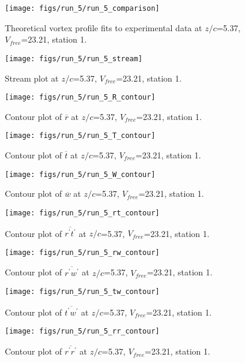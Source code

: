 \begin{figure}[H]
\centering
\texttt{[image: figs/run\_5/run\_5\_comparison]}
\caption{Theoretical vortex profile fits to experimental data at $z/c$=5.37, $V_{free}$=23.21, station 1.}
\end{figure}


\begin{figure}[H]
\centering
\texttt{[image: figs/run\_5/run\_5\_stream]}
\caption{Stream plot at $z/c$=5.37, $V_{free}$=23.21, station 1.}
\end{figure}


\begin{figure}[H]
\centering
\texttt{[image: figs/run\_5/run\_5\_R\_contour]}
\caption{Contour plot of $\overline{r}$ at $z/c$=5.37, $V_{free}$=23.21, station 1.}
\end{figure}


\begin{figure}[H]
\centering
\texttt{[image: figs/run\_5/run\_5\_T\_contour]}
\caption{Contour plot of $\overline{t}$ at $z/c$=5.37, $V_{free}$=23.21, station 1.}
\end{figure}


\begin{figure}[H]
\centering
\texttt{[image: figs/run\_5/run\_5\_W\_contour]}
\caption{Contour plot of $\overline{w}$ at $z/c$=5.37, $V_{free}$=23.21, station 1.}
\end{figure}


\begin{figure}[H]
\centering
\texttt{[image: figs/run\_5/run\_5\_rt\_contour]}
\caption{Contour plot of $\overline{r^\prime t^\prime}$ at $z/c$=5.37, $V_{free}$=23.21, station 1.}
\end{figure}


\begin{figure}[H]
\centering
\texttt{[image: figs/run\_5/run\_5\_rw\_contour]}
\caption{Contour plot of $\overline{r^\prime w^\prime}$ at $z/c$=5.37, $V_{free}$=23.21, station 1.}
\end{figure}


\begin{figure}[H]
\centering
\texttt{[image: figs/run\_5/run\_5\_tw\_contour]}
\caption{Contour plot of $\overline{t^\prime w^\prime}$ at $z/c$=5.37, $V_{free}$=23.21, station 1.}
\end{figure}


\begin{figure}[H]
\centering
\texttt{[image: figs/run\_5/run\_5\_rr\_contour]}
\caption{Contour plot of $\overline{r^\prime r^\prime}$ at $z/c$=5.37, $V_{free}$=23.21, station 1.}
\end{figure}


